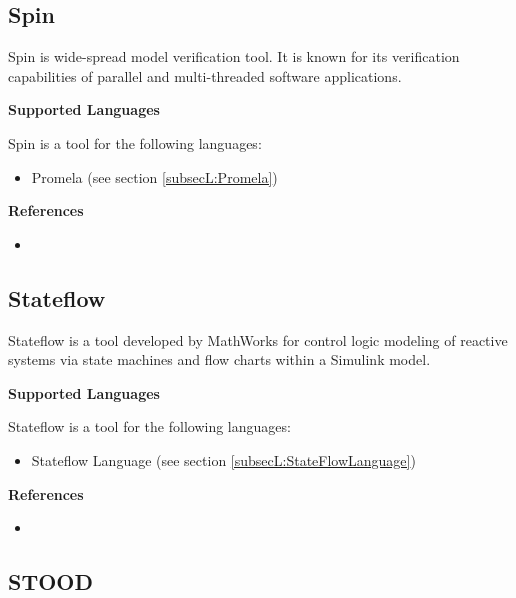\subsection{Spin}
\label{subsecT:Spin}


Spin is wide-spread model verification tool. It is known for its verification capabilities of parallel and multi-threaded software applications.

\textbf{Supported Languages}

Spin is a tool for the following languages:
\begin{itemize}
	\item Promela (see section \ref{subsecL:Promela})
\end{itemize}


\textbf{References}
\begin{itemize}
	
\item {}
\end{itemize}



\subsection{Stateflow}
\label{subsecT:Stateflow}


Stateflow is a tool developed by MathWorks for control logic modeling of reactive systems via state machines and flow charts within a Simulink model.

\textbf{Supported Languages}

Stateflow is a tool for the following languages:
\begin{itemize}
	\item Stateflow Language (see section \ref{subsecL:StateFlowLanguage})
\end{itemize}


\textbf{References}
\begin{itemize}
	
\item {}
\end{itemize}



\subsection{STOOD}
\label{subsecT:STOOD}


